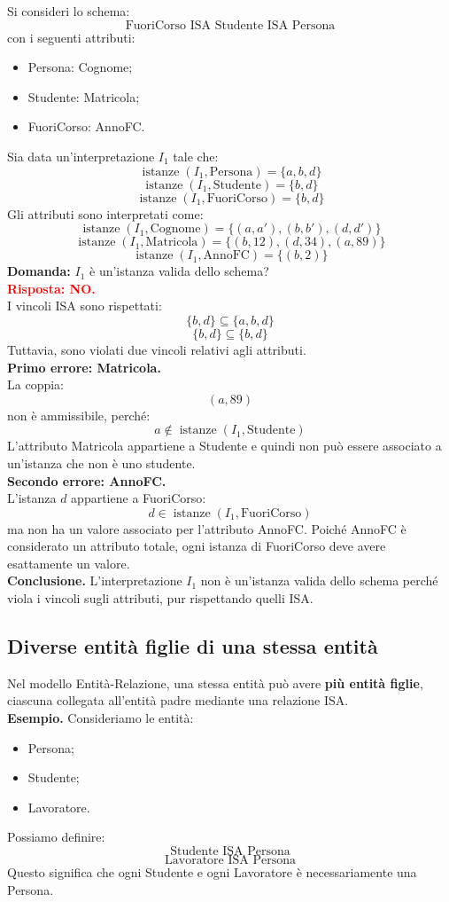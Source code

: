 Si consideri lo schema:
\[
\text{FuoriCorso ISA Studente ISA Persona}
\]
con i seguenti attributi:
\begin{itemize}
    \item Persona: Cognome;
    \item Studente: Matricola;
    \item FuoriCorso: AnnoFC.
\end{itemize}
\noindent
Sia data un'interpretazione $I_1$ tale che:
\[
\operatorname{istanze}(I_1,\text{Persona})
=
\{a,b,d\}
\]
\[
\operatorname{istanze}(I_1,\text{Studente})
=
\{b,d\}
\]
\[
\operatorname{istanze}(I_1,\text{FuoriCorso})
=
\{b,d\}
\]
Gli attributi sono interpretati come:
\[
\operatorname{istanze}(I_1,\text{Cognome})
=
\{(a,a'),(b,b'),(d,d')\}
\]
\[
\operatorname{istanze}(I_1,\text{Matricola})
=
\{(b,12),(d,34),(a,89)\}
\]
\[
\operatorname{istanze}(I_1,\text{AnnoFC})
=
\{(b,2)\}
\]
\textbf{Domanda:} $I_1$ è un'istanza valida
dello schema?\\
\textcolor{red}{\textbf{Risposta: NO.}}\\
I vincoli ISA sono rispettati:
\[
\{b,d\}\subseteq\{a,b,d\}
\]
\[
\{b,d\}\subseteq\{b,d\}
\]
Tuttavia, sono violati due vincoli
relativi agli attributi.\\
\textbf{Primo errore: Matricola.}\\
La coppia:
\[
(a,89)
\]
non è ammissibile, perché:
\[
a\notin
\operatorname{istanze}(I_1,\text{Studente})
\]
L'attributo Matricola appartiene a Studente
e quindi non può essere associato
a un'istanza che non è uno studente.\\
\textbf{Secondo errore: AnnoFC.}\\
L'istanza $d$ appartiene a FuoriCorso:
\[
d\in
\operatorname{istanze}(I_1,\text{FuoriCorso})
\]
ma non ha un valore associato
per l'attributo AnnoFC.
Poiché AnnoFC è considerato un attributo
totale, ogni istanza di FuoriCorso
deve avere esattamente un valore.\\
\textbf{Conclusione.}
L'interpretazione $I_1$ non è un'istanza
valida dello schema perché viola
i vincoli sugli attributi,
pur rispettando quelli ISA.



\subsection*{Diverse entità figlie di una stessa entità}
Nel modello Entità-Relazione, una stessa entità può avere
\textbf{più entità figlie}, ciascuna collegata all'entità
padre mediante una relazione ISA.\\
\textcolor{verdeEsempio}{\textbf{Esempio.}}
Consideriamo le entità:
\begin{itemize}
    \item Persona;
    \item Studente;
    \item Lavoratore.
\end{itemize}
Possiamo definire:
\[
\text{Studente ISA Persona}
\]
\[
\text{Lavoratore ISA Persona}
\]
Questo significa che ogni Studente e ogni Lavoratore
è necessariamente una Persona.

